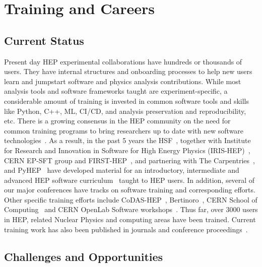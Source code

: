 \documentclass[10pt,a4paper]{article}
\begin{document}
\section{Training and Careers}\label{training-and-careers}

\subsection{Current Status}\label{current-status}

Present day HEP experimental collaborations have hundreds or thousands of users.
They have internal structures and onboarding processes to help new users learn
and jumpstart software and physics analysis contributions. While most analysis
tools and software frameworks taught are experiment-specific, a considerable
amount of training is invested in common software tools and skills like Python,
C++, ML, CI/CD, and analysis preservation and reproducibility, etc. There is a
growing consensus in the HEP community on the need for common training programs
to bring researchers up to date with new software
technologies~\cite{HSF-CWP-2017-02, Snowmass:2021_community_engagement_frontier, Snowmass:2021_CEF_report, Snowmass:2021_career_pipeline}.
As a result, in the past 5 years the HSF~\cite{HSFTraining}, together with Institute for
Research and Innovation in Software for High Energy Physics (IRIS-HEP)~\cite{IRISHEP:Training},
CERN EP-SFT group and FIRST-HEP~\cite{FIRST-HEP}, and partnering with The
Carpentries~\cite{TheCarpentries}, and PyHEP~\cite{HSFPyHEP} have developed material for an
introductory, intermediate and advanced HEP software curriculum~\cite{HSFTrainingCenter} taught
to HEP users. In addition, several of our major conferences have tracks on
software training and corresponding efforts. Other specific training efforts
include CoDAS-HEP~\cite{CODAS-HEP}, Bertinoro~\cite{INFN:ESC_school}, CERN School of
Computing~\cite{CERN:computing_school} and CERN OpenLab Software
workshops~\cite{CERN:SW_workshops}. Thus far,
over 3000 users in HEP, related Nuclear Physics and computing areas have been
trained. Current training work has also been published in journals and
conference proceedings~\cite{Malik:2919564, Malik:chep2023_training_outreach, Malik2021Software}.

\subsection{Challenges and
Opportunities}\label{challenges-and-opportunities}
\end{document}
